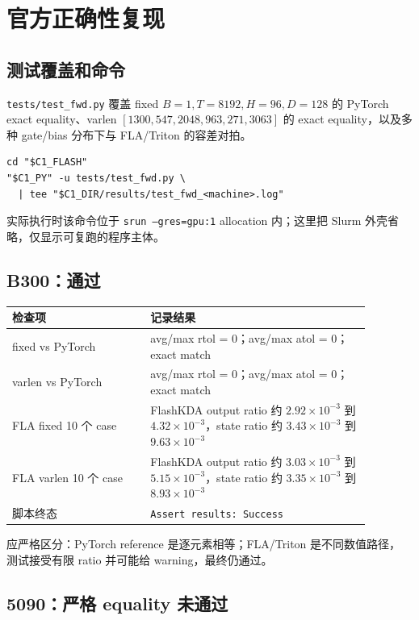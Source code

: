 \documentclass[11pt,a4paper,fontset=none]{ctexart}
\newcommand{\code}[1]{\texttt{#1}}
\begin{document}
\section{官方正确性复现}

\subsection{测试覆盖和命令}

\code{tests/test\_fwd.py} 覆盖 fixed
\(B=1,T=8192,H=96,D=128\) 的 PyTorch exact equality、varlen
\([1300,547,2048,963,271,3063]\) 的 exact equality，以及多种 gate/bias
分布下与 FLA/Triton 的容差对拍。

\begin{lstlisting}
cd "$C1_FLASH"
"$C1_PY" -u tests/test_fwd.py \
  | tee "$C1_DIR/results/test_fwd_<machine>.log"
\end{lstlisting}

实际执行时该命令位于 \code{srun --gres=gpu:1} allocation 内；这里把
Slurm 外壳省略，仅显示可复跑的程序主体。

\subsection{B300：通过}

\begin{longtable}{@{}L{0.34\linewidth}L{0.54\linewidth}@{}}
\toprule
检查项 & 记录结果 \\
\midrule
\endhead
\bottomrule
\endlastfoot
fixed vs PyTorch & avg/max rtol = 0；avg/max atol = 0；exact match \\
varlen vs PyTorch & avg/max rtol = 0；avg/max atol = 0；exact match \\
FLA fixed 10 个 case & FlashKDA output ratio 约 \(2.92\times10^{-3}\) 到 \(4.32\times10^{-3}\)，state ratio 约 \(3.43\times10^{-3}\) 到 \(9.63\times10^{-3}\) \\
FLA varlen 10 个 case & FlashKDA output ratio 约 \(3.03\times10^{-3}\) 到 \(5.15\times10^{-3}\)，state ratio 约 \(3.35\times10^{-3}\) 到 \(8.93\times10^{-3}\) \\
脚本终态 & \code{Assert results: Success} \\
\end{longtable}

应严格区分：PyTorch reference 是逐元素相等；FLA/Triton 是不同数值路径，
测试接受有限 ratio 并可能给 warning，最终仍通过。

\subsection{5090：严格 equality 未通过}
\end{document}

